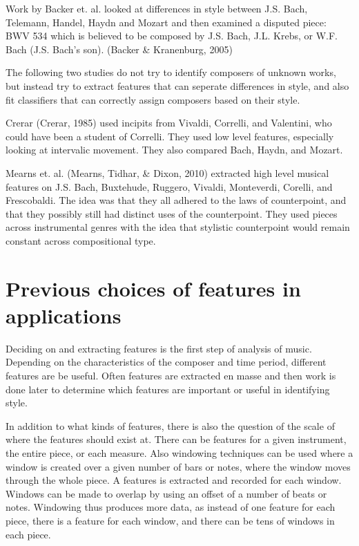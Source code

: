 \documentclass[12pt,twoside]{reedthesis}
\theoremstyle{definition}
\theoremstyle{definition}
\theoremstyle{definition}
\theoremstyle{remark}
\begin{document}
Work by Backer et. al. looked at differences in style between J.S. Bach,
Telemann, Handel, Haydn and Mozart and then examined a disputed piece:
BWV 534 which is believed to be composed by J.S. Bach, J.L. Krebs, or
W.F. Bach (J.S. Bach's son). (Backer \& Kranenburg, 2005)

The following two studies do not try to identify composers of unknown
works, but instead try to extract features that can seperate differences
in style, and also fit classifiers that can correctly assign composers
based on their style.

Crerar (Crerar, 1985) used incipits from Vivaldi, Correlli, and
Valentini, who could have been a student of Correlli. They used low
level features, especially looking at intervalic movement. They also
compared Bach, Haydn, and Mozart.

Mearns et. al. (Mearns, Tidhar, \& Dixon, 2010) extracted high level
musical features on J.S. Bach, Buxtehude, Ruggero, Vivaldi, Monteverdi,
Corelli, and Frescobaldi. The idea was that they all adhered to the laws
of counterpoint, and that they possibly still had distinct uses of the
counterpoint. They used pieces across instrumental genres with the idea
that stylistic counterpoint would remain constant across compositional
type.

\section{Previous choices of features in
applications}\label{previous-choices-of-features-in-applications}

Deciding on and extracting features is the first step of analysis of
music. Depending on the characteristics of the composer and time period,
different features are be useful. Often features are extracted en masse
and then work is done later to determine which features are important or
useful in identifying style.

In addition to what kinds of features, there is also the question of the
scale of where the features should exist at. There can be features for a
given instrument, the entire piece, or each measure. Also windowing
techniques can be used where a window is created over a given number of
bars or notes, where the window moves through the whole piece. A
features is extracted and recorded for each window. Windows can be made
to overlap by using an offset of a number of beats or notes. Windowing
thus produces more data, as instead of one feature for each piece, there
is a feature for each window, and there can be tens of windows in each
piece.
\end{document}
